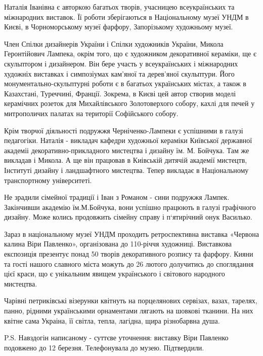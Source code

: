 Наталія Іванівна є авторкою багатьох творів, учасницею всеукраїнських та
міжнародних виставок. Її роботи зберігаються в Національному музеї УНДМ в
Києві, в Чорноморському музеї фарфору, Запорізькому художньому музеї.

Член Спілки дизайнерів України і Спілки художників України, Микола
Геронтійович Лампека, окрім того, що є художником декоративної кераміки, ще є
скульптором і дизайнером. Він бере участь у всеукраїнських і міжнародних
художніх виставках і симпозіумах кам'яної та дерев'яної скульптури. Його
монументально-скульптурні роботи є в багатьох українських містах, а також в
Казахстані, Туреччині, Франції. Зокрема, в Києві цей автор створив моделі
керамічних розеток для Михайлівського Золотоверхого собору, кахлі для печей у
митрополичих палатах на території Софійського собору.

Крім творчої діяльності подружжя Черніченко-Лампеки є успішними в галузі
педагогіки. Наталія - викладач кафедри художньої кераміки Київської державної
академіі декоративно-прикладного мистецтва і дизайну їм. М. Бойчука. Там же
викладав і Микола. А ще він працював в Киівській дитячій академії мистецтв,
Інституті дизайну і ландшафтного мистецтва. Тепер викладає в Національному
транспортному університеті.

Не зрадили сімейної традиції і Іван з Романом - сини подружжя Лампек.
Закінчивши академію їм.М.Бойчука, вони успішно працюють в галузі графічного
дизайну. Може колись продовжить сімейну справу і п‘ятирічний онук Василько.

Зараз в національному музеї УНДМ проходить ретроспективна виставка «Червона
калина Віри Павленко», організована до 110-річчя художниці. Виставкова
експозиція презентує понад 50 творів декоративного розпису та фарфору. Кияни
та гості нашого славного міста можуть до 26 лютого долучитись до споглядання
цієї краси, що є унікальним явищем українського і світового народного
мистецтва. 

Чарівні петриківські візерунки квітнуть на порцелянових сервізах, вазах,
тарелях, панно, рідними українськими орнаментами лягають на шовкові тканини.
На них квітне сама Украіна, її світла, тепла, лагідна, щира різнобарвна душа.

P.S. Навздогін написаному - суттєве уточнення: виставку Віри Павленко
подовжено до 12 березня. Телефонувала до музею. Підтвердили.
